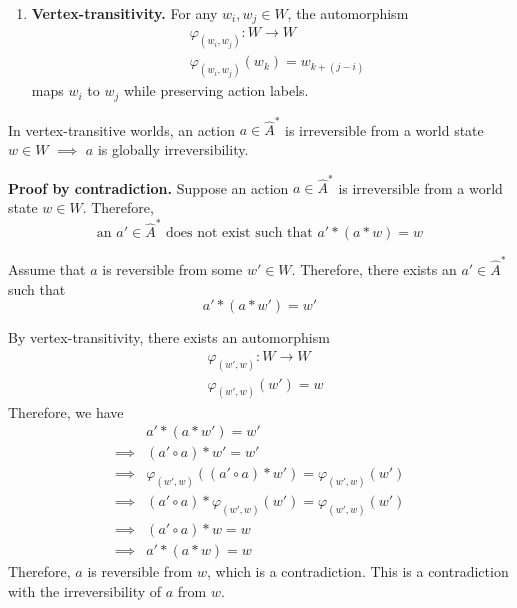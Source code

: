 \begin{proofE}
\begin{enumerate}
    \item \textbf{Vertex-transitivity.}
    For any $w_{i}, w_{j} \in W$, the automorphism
    \begin{equation}
    \begin{aligned}
        & \varphi_{(w_{i}, w_{j})}: W \to W \\
        & \varphi_{(w_{i}, w_{j})}(w_{k}) = w_{k+(j-i)}
    \end{aligned}
    \end{equation}
    maps $w_{i}$ to $w_{j}$ while preserving action labels.
\end{enumerate}
\end{proofE}


\begin{propositionE}[][normal]
    In vertex-transitive worlds, an action $a \in \hat{A}^{*}$ is irreversible from a world state $w \in W$ $\implies$ $a$ is globally irreversibility.
\end{propositionE}
\begin{proofE}
    \textbf{Proof by contradiction.}
    Suppose an action $a \in \hat{A}^{*}$ is irreversible from a world state $w \in W$.
    Therefore,
    \begin{equation}
        \text{an } a' \in \hat{A}^{*} \text{ does not exist such that } a' \ast (a \ast w) = w
    \end{equation}

    Assume that $a$ is reversible from some $w' \in W$.
    Therefore, there exists an $a' \in \hat{A}^{*}$ such that
    \begin{equation}
        a' \ast (a \ast w') = w'
    \end{equation}

    By vertex-transitivity, there exists an automorphism
    \begin{equation}
    \begin{aligned}
        & \varphi_{(w', w)}: W \to W \\
        & \varphi_{(w', w)}(w') = w
    \end{aligned}
    \end{equation}
    Therefore, we have
    \begin{align}
        & a' \ast (a \ast w') = w' \\
        \implies & (a' \circ a) \ast w' = w' \\
        \implies & \varphi_{(w', w)}((a' \circ a) \ast w') = \varphi_{(w', w)}(w') \\
        \implies & (a' \circ a) \ast \varphi_{(w', w)}(w') = \varphi_{(w', w)}(w') \\
        \implies & (a' \circ a) \ast w = w \\
        \implies & a' \ast (a \ast w) = w
    \end{align}
    Therefore, $a$ is reversible from $w$, which is a contradiction.
    This is a contradiction with the irreversibility of $a$ from $w$.
\end{proofE}



